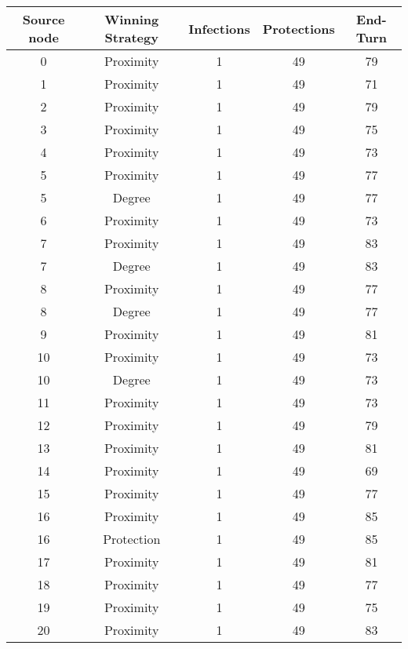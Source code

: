 \documentclass[results.tex]{subfiles}
\begin{document}
\begin{center}
  \begin{tabular}{| c || c | c | c | c |}
    \hline
    {\bfseries Source node} & {\bfseries Winning Strategy} & {\bfseries Infections} & {\bfseries Protections} & {\bfseries End-Turn} \\  %
    \hline\hline
    0 & Proximity & 1 & 49 & 79 \\ 
    \hline
    1 & Proximity & 1 & 49 & 71 \\ 
    \hline
    2 & Proximity & 1 & 49 & 79 \\ 
    \hline
    3 & Proximity & 1 & 49 & 75 \\ 
    \hline
    4 & Proximity & 1 & 49 & 73 \\ 
    \hline
    5 & Proximity & 1 & 49 & 77 \\ 
    \hline
    5 & Degree & 1 & 49 & 77 \\ 
    \hline
    6 & Proximity & 1 & 49 & 73 \\ 
    \hline
    7 & Proximity & 1 & 49 & 83 \\ 
    \hline
    7 & Degree & 1 & 49 & 83 \\ 
    \hline
    8 & Proximity & 1 & 49 & 77 \\ 
    \hline
    8 & Degree & 1 & 49 & 77 \\ 
    \hline
    9 & Proximity & 1 & 49 & 81 \\ 
    \hline
    10 & Proximity & 1 & 49 & 73 \\ 
    \hline
    10 & Degree & 1 & 49 & 73 \\ 
    \hline
    11 & Proximity & 1 & 49 & 73 \\ 
    \hline
    12 & Proximity & 1 & 49 & 79 \\ 
    \hline
    13 & Proximity & 1 & 49 & 81 \\ 
    \hline
    14 & Proximity & 1 & 49 & 69 \\ 
    \hline
    15 & Proximity & 1 & 49 & 77 \\ 
    \hline
    16 & Proximity & 1 & 49 & 85 \\ 
    \hline
    16 & Protection & 1 & 49 & 85 \\ 
    \hline
    17 & Proximity & 1 & 49 & 81 \\ 
    \hline
    18 & Proximity & 1 & 49 & 77 \\ 
    \hline
    19 & Proximity & 1 & 49 & 75 \\ 
    \hline
    20 & Proximity & 1 & 49 & 83 \\ 

\end{tabular}
\end{center}
\end{document}
